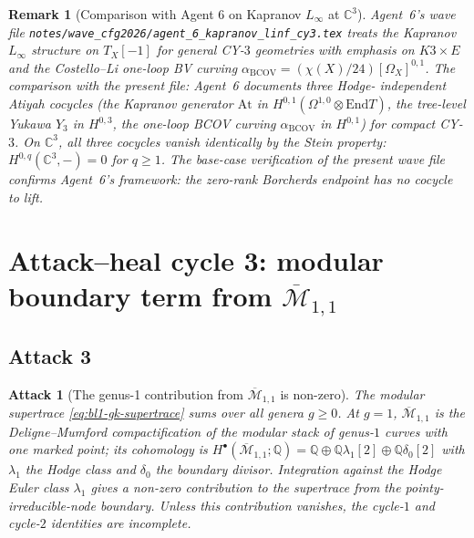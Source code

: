 \documentclass[11pt]{article}
\newtheorem{remark}[theorem]{Remark}
\newtheorem{attack}[theorem]{Attack}
\providecommand{\End}{\mathrm{End}}
\providecommand{\BCOV}{\mathrm{BCOV}}
\providecommand{\C}{\mathbb{C}}
\providecommand{\QQ}{\mathbb{Q}}
\providecommand{\Mbar}{\overline{\mathcal M}}
\begin{document}
\begin{remark}[Comparison with Agent 6 on Kapranov $L_\infty$ at $\C^3$]
\label{rem:bl1-agent-6-comparison}
Agent~6's wave file
\texttt{notes/wave\_cfg2026/agent\_6\_kapranov\_linf\_cy3.tex} treats
the Kapranov $L_\infty$ structure on $T_X[-1]$ for general CY-$3$
geometries with emphasis on $K3 \times E$ and the Costello--Li one-loop
BV curving $\alpha_{\BCOV} = (\chi(X)/24)[\Omega_X]^{0,1}$. The
comparison with the present file: Agent~6 documents three Hodge-
independent Atiyah cocycles (the Kapranov generator $\mathrm{At}$ in
$H^{0,1}(\Omega^{1,0} \otimes \End T)$, the tree-level Yukawa $Y_3$ in
$H^{0,3}$, the one-loop BCOV curving $\alpha_{\BCOV}$ in $H^{0,1}$)
for \emph{compact} CY-$3$. On $\C^3$, all three cocycles vanish
identically by the Stein property: $H^{0,q}(\C^3, -) = 0$ for $q \geq 1$.
The base-case verification of the present wave file confirms Agent~6's
framework: the zero-rank Borcherds endpoint has no cocycle to lift.
\end{remark}

\section{Attack--heal cycle 3: modular boundary term from $\Mbar_{1,1}$}
\label{sec:bl1-cycle-3}

\subsection{Attack 3}
\label{subsec:bl1-attack-3}

\begin{attack}[The genus-1 contribution from $\Mbar_{1,1}$ is non-zero]
\label{attack:bl1-genus-1-boundary}
The modular supertrace \eqref{eq:bl1-gk-supertrace} sums over all
genera $g \geq 0$. At $g = 1$, $\Mbar_{1,1}$ is the Deligne--Mumford
compactification of the modular stack of genus-$1$ curves with one
marked point; its cohomology is
$H^\bullet(\Mbar_{1,1}; \QQ) = \QQ \oplus \QQ\lambda_1[2] \oplus
\QQ \delta_0[2]$ with $\lambda_1$ the Hodge class and $\delta_0$ the
boundary divisor. Integration against the Hodge Euler class $\lambda_1$
gives a non-zero contribution to the supertrace from the
pointy-irreducible-node boundary. Unless this contribution vanishes,
the cycle-$1$ and cycle-$2$ identities are incomplete.
\end{attack}
\end{document}
